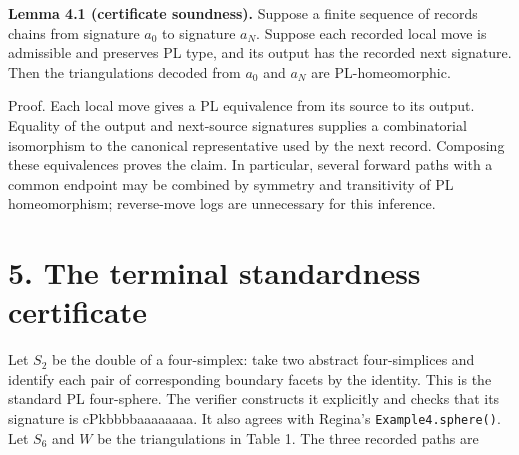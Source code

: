 \documentclass[11pt,letterpaper]{article}
\begin{document}
\medskip\noindent\textbf{Lemma 4.1 (certificate soundness).} Suppose a finite sequence of records chains from signature $a_0$ to signature $a_N$. Suppose each recorded local move is admissible and preserves PL type, and its output has the recorded next signature. Then the triangulations decoded from $a_0$ and $a_N$ are PL-homeomorphic.

Proof. Each local move gives a PL equivalence from its source to its output. Equality of the output and next-source signatures supplies a combinatorial isomorphism to the canonical representative used by the next record. Composing these equivalences proves the claim. In particular, several forward paths with a common endpoint may be combined by symmetry and transitivity of PL homeomorphism; reverse-move logs are unnecessary for this inference.

\section*{5. The terminal standardness certificate}
Let $S_2$ be the double of a four-simplex: take two abstract four-simplices and identify each pair of corresponding boundary facets by the identity. This is the standard PL four-sphere. The verifier constructs it explicitly and checks that its signature is \mbox{\small\ttfamily cPkbbbbaaaaaaaa}. It also agrees with Regina's {\small\texttt{Example4.sphere()}}. Let $S_6$ and $W$ be the triangulations in Table 1. The three recorded paths are
\end{document}
